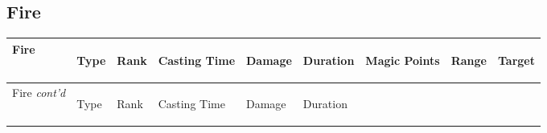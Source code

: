 \documentclass[twoside]{book}
\begin{document}
    

\subsection{Fire}
    
\begin{longtable}{p{1.25in}lp{2em}p{3em}llp{7em}ll} 
  Fire
  &
  \begin{turn}{70}{Type}\end{turn}
          
  &
  \begin{turn}{70}{Rank}\end{turn}
          
  &
  \begin{turn}{70}{Casting Time}\end{turn}
          
  &
  \begin{turn}{70}{Damage}\end{turn}
          
  &
  \begin{turn}{70}{Duration}\end{turn}
          
  &
  \begin{turn}{70}{Magic Points}\end{turn}
          
  &
  \begin{turn}{70}{Range}\end{turn}
          
  &
  \begin{turn}{70}{Target}\end{turn}
          
  \\
  \hline
  \hline
  \endfirsthead
  Fire \textit{cont'd}
        
  &
  \begin{turn}{70}{Type}\end{turn}
          
  &
  \begin{turn}{70}{Rank}\end{turn}
          
  &
  \begin{turn}{70}{Casting Time}\end{turn}
          
  &
  \begin{turn}{70}{Damage}\end{turn}
          
  &
  \begin{turn}{70}{Duration}\end{turn}
          

\end{longtable}
\end{document}
